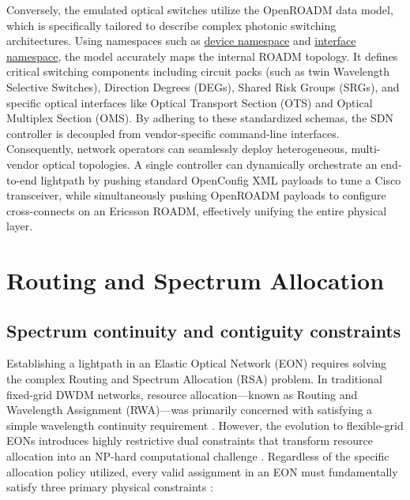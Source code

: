 Conversely, the emulated optical switches utilize the OpenROADM data model, which is specifically tailored to describe complex photonic switching architectures. Using namespaces such as \href{http://org/openroadm/device}{device namespace} and \href{http://org/openroadm/interfaces}{interface namespace}, the model accurately maps the internal ROADM topology. It defines critical switching components including circuit packs (such as twin Wavelength Selective Switches), Direction Degrees (DEGs), Shared Risk Groups (SRGs), and specific optical interfaces like Optical Transport Section (OTS) and Optical Multiplex Section (OMS). By adhering to these standardized schemas, the SDN controller is decoupled from vendor-specific command-line interfaces. Consequently, network operators can seamlessly deploy heterogeneous, multi-vendor optical topologies. A single controller can dynamically orchestrate an end-to-end lightpath by pushing standard OpenConfig XML payloads to tune a Cisco transceiver, while simultaneously pushing OpenROADM payloads to configure cross-connects on an Ericsson ROADM, effectively unifying the entire physical layer.
\section{Routing and Spectrum Allocation}
\subsection{Spectrum continuity and contiguity constraints}
Establishing a lightpath in an Elastic Optical Network (EON) requires solving the complex Routing and Spectrum Allocation (RSA) problem. In traditional fixed-grid DWDM networks, resource allocation—known as Routing and Wavelength Assignment (RWA)—was primarily concerned with satisfying a simple wavelength continuity requirement \cite{rsaHeuristicSliced}. However, the evolution to flexible-grid EONs introduces highly restrictive dual constraints that transform resource allocation into an NP-hard computational challenge \cite{rsaHeuristicSliced}. Regardless of the specific allocation policy utilized, every valid assignment in an EON must fundamentally satisfy three primary physical constraints \cite{algorithmsRSATaxonomy}:

